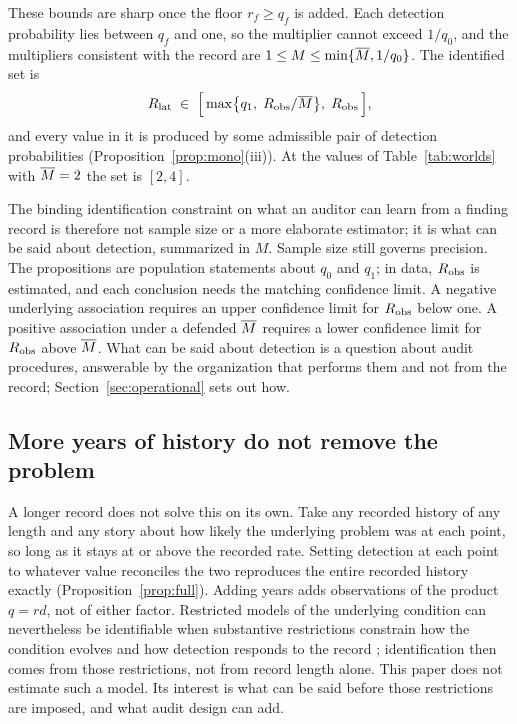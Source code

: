 These bounds are sharp once the floor $r_f \ge q_f$ is added. Each detection
probability lies between $q_f$ and one, so the multiplier cannot exceed
$1/q_0$, and the multipliers consistent with the record are $1 \le M \le
\min\{\overline{M}, 1/q_0\}$. The identified set is
%
\begin{equation}\label{eq:sharp}
  R_{\mathrm{lat}} \;\in\; \Bigl[\, \max\bigl\{ q_1,\; R_{\mathrm{obs}}/\overline{M} \bigr\},\; R_{\mathrm{obs}} \,\Bigr] ,
\end{equation}
%
and every value in it is produced by some admissible pair of detection
probabilities (Proposition~\ref{prop:mono}(iii)). At the values of
Table~\ref{tab:worlds} with $\overline{M} = 2$ the set is $[2, 4]$.

The binding identification constraint on what an auditor can learn from a
finding record is therefore not sample size or a more elaborate estimator; it
is what can be said about detection, summarized in $M$. Sample size still
governs precision. The propositions are population statements about $q_0$ and
$q_1$; in data, $R_{\mathrm{obs}}$ is estimated, and each conclusion needs the matching
confidence limit. A negative underlying association requires an upper
confidence limit for $R_{\mathrm{obs}}$ below one. A positive association under a
defended $\overline{M}$ requires a lower confidence limit for $R_{\mathrm{obs}}$ above
$\overline{M}$. What can be said about detection is a question about audit
procedures, answerable by the organization that performs them and not from
the record; Section~\ref{sec:operational} sets out how.

\subsection{More years of history do not remove the problem}

A longer record does not solve this on its own. Take any recorded history of
any length and any story about how likely the underlying problem was at each
point, so long as it stays at or above the recorded rate. Setting detection
at each point to whatever value reconciles the two reproduces the entire
recorded history exactly (Proposition~\ref{prop:full}). Adding years adds observations of the product
$q = rd$, not of either factor. Restricted models of the underlying condition
can nevertheless be identifiable when substantive restrictions constrain how
the condition evolves and how detection responds to the record
\citep{allman2009}; identification then comes from those restrictions, not
from record length alone. This paper does not estimate such a model. Its
interest is what can be said before those restrictions are imposed, and what
audit design can add.
